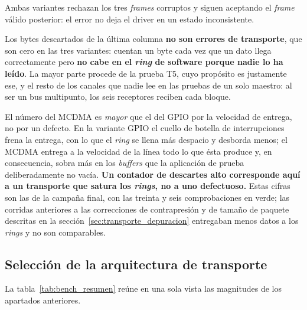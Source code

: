 Ambas variantes rechazan los tres \textit{frames} corruptos y siguen aceptando el \textit{frame} válido posterior:
el error no deja el driver en un estado inconsistente.

Los bytes descartados de la última columna \textbf{no son errores de transporte}, que son cero en
las tres variantes: cuentan un byte cada vez que un dato llega correctamente pero \textbf{no cabe
en el \textit{ring} de software porque nadie lo ha leído}. La mayor parte procede de la prueba T5,
cuyo propósito es justamente ese, y el resto de los canales que nadie lee en las pruebas de un
solo maestro: al ser un bus multipunto, los seis receptores reciben cada bloque.

El número del MCDMA es \textit{mayor} que el del GPIO por la velocidad de entrega, no por un
defecto. En la variante GPIO el cuello de botella de interrupciones frena la entrega, con lo que
el \textit{ring} se llena más despacio y desborda menos; el MCDMA entrega a la velocidad de la
línea todo lo que ésta produce y, en consecuencia, sobra más en los \textit{buffers} que la
aplicación de prueba deliberadamente no vacía. \textbf{Un contador de descartes alto corresponde
aquí a un transporte que satura los \textit{rings}, no a uno defectuoso.} Estas cifras son las de
la campaña final, con las treinta y seis comprobaciones en verde; las corridas anteriores a las
correcciones de contrapresión y de tamaño de paquete descritas en la
sección~\ref{sec:transporte_depuracion} entregaban menos datos a los \textit{rings} y no son
comparables.

\subsection{Selección de la arquitectura de transporte}

La tabla~\ref{tab:bench_resumen} reúne en una sola vista las magnitudes de los apartados
anteriores.

